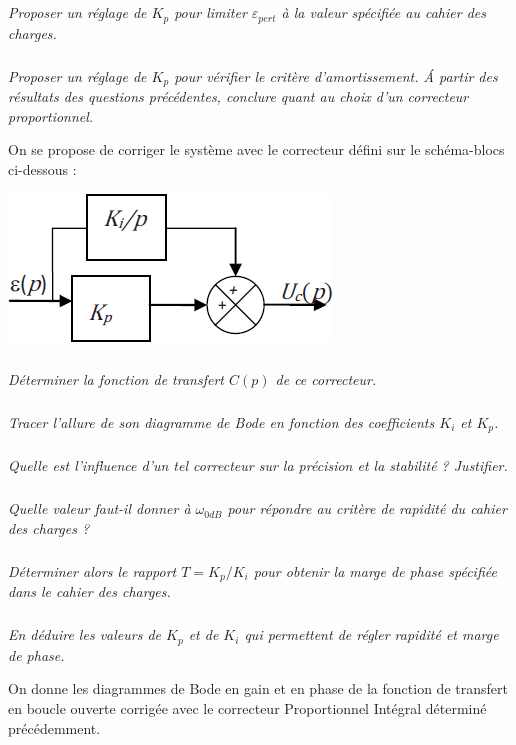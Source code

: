 \documentclass[10pt,fleqn]{article} %
\begin{document}
\begin{multicols}{2}
\subparagraph{}
\textit{Proposer un réglage de $K_p$ pour limiter $\varepsilon_{pert}$ à la valeur spécifiée au cahier des charges.}

\subparagraph{}
\textit{Proposer un réglage de $K_p$ pour vérifier le critère d’amortissement. \'A partir des résultats des questions précédentes, conclure quant au choix d’un correcteur proportionnel.}

On se propose de corriger le système avec le correcteur défini sur le schéma-blocs ci-dessous :
\begin{center}
\includegraphics[width=.4\linewidth]{images_02/fig_07}
\end{center}


\subparagraph{}
\textit{Déterminer la fonction de transfert $C(p)$ de ce correcteur.}

\subparagraph{}
\textit{Tracer l’allure de son diagramme de Bode en fonction des coefficients $K_i$ et $K_p$.}

\subparagraph{}
\textit{Quelle est l’influence d’un tel correcteur sur la précision et la stabilité ? Justifier.}

\subparagraph{}
\textit{Quelle valeur faut-il donner à $\omega_{0dB}$ pour répondre au critère de rapidité du cahier des charges ?}

\subparagraph{}
\textit{Déterminer alors le rapport $T=K_p/K_i$ pour obtenir la marge de phase spécifiée dans le cahier des charges.}

\subparagraph{}
\textit{En déduire les valeurs de $K_p$ et de $K_i$ qui permettent de régler rapidité et marge de phase.}


On donne les diagrammes de Bode en gain et en phase de la fonction de transfert en boucle ouverte corrigée avec le correcteur Proportionnel Intégral déterminé précédemment.


\end{multicols}
\end{document}
